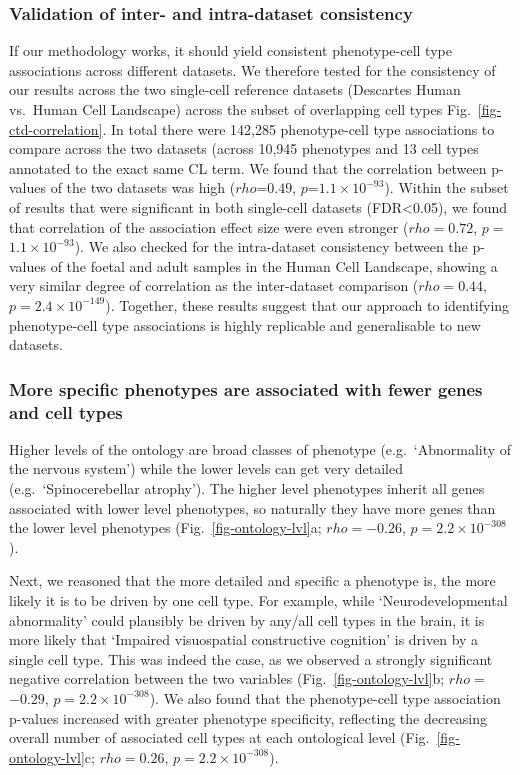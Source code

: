 \documentclass[
]{article}
\begin{document}
\subsubsection{Validation of inter- and intra-dataset
consistency}\label{validation-of-inter--and-intra-dataset-consistency}

If our methodology works, it should yield consistent phenotype-cell type
associations across different datasets. We therefore tested for the
consistency of our results across the two single-cell reference datasets
(Descartes Human vs.~Human Cell Landscape) across the subset of
overlapping cell types Fig.~\ref{fig-ctd-correlation}. In total there
were 142,285 phenotype-cell type associations to compare across the two
datasets (across 10,945 phenotypes and 13 cell types annotated to the
exact same CL term. We found that the correlation between p-values of
the two datasets was high (\(rho\)=\(0.49\),
\(p\)=\(1.1 \times 10^{-93}\)). Within the subset of results that were
significant in both single-cell datasets (FDR\textless0.05), we found
that correlation of the association effect size were even stronger
(\(rho=\)\(0.72\), \(p=\)\(1.1 \times 10^{-93}\)). We also checked for
the intra-dataset consistency between the p-values of the foetal and
adult samples in the Human Cell Landscape, showing a very similar degree
of correlation as the inter-dataset comparison (\(rho=\)\(0.44\),
\(p=\)\(2.4 \times 10^{-149}\)). Together, these results suggest that
our approach to identifying phenotype-cell type associations is highly
replicable and generalisable to new datasets.

\subsubsection{More specific phenotypes are associated with fewer genes
and cell
types}\label{more-specific-phenotypes-are-associated-with-fewer-genes-and-cell-types}

Higher levels of the ontology are broad classes of phenotype
(e.g.~`Abnormality of the nervous system') while the lower levels can
get very detailed (e.g.~`Spinocerebellar atrophy'). The higher level
phenotypes inherit all genes associated with lower level phenotypes, so
naturally they have more genes than the lower level phenotypes
(Fig.~\ref{fig-ontology-lvl}a; \(rho=\)\(-0.26\),
\(p=\)\(2.2 \times 10^{-308}\)).

Next, we reasoned that the more detailed and specific a phenotype is,
the more likely it is to be driven by one cell type. For example, while
`Neurodevelopmental abnormality' could plausibly be driven by any/all
cell types in the brain, it is more likely that `Impaired visuospatial
constructive cognition' is driven by a single cell type. This was indeed
the case, as we observed a strongly significant negative correlation
between the two variables (Fig.~\ref{fig-ontology-lvl}b;
\(rho=\)\(-0.29\), \(p=\)\(2.2 \times 10^{-308}\)). We also found that
the phenotype-cell type association p-values increased with greater
phenotype specificity, reflecting the decreasing overall number of
associated cell types at each ontological level
(Fig.~\ref{fig-ontology-lvl}c; \(rho=\)\(0.26\),
\(p=\)\(2.2 \times 10^{-308}\)).
\end{document}
